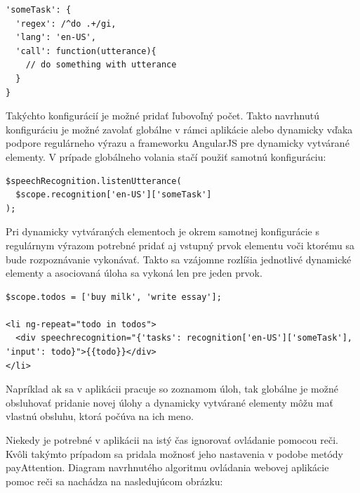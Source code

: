 \begin{lstlisting}
'someTask': {
  'regex': /^do .+/gi,
  'lang': 'en-US',
  'call': function(utterance){
    // do something with utterance
  }
}
\end{lstlisting}


Takýchto konfigurácií je možné pridať ľubovoľný počet. Takto navrhnutú konfiguráciu je možné zavolať globálne v rámci aplikácie alebo dynamicky vďaka podpore regulárneho výrazu a frameworku AngularJS pre dynamicky vytvárané elementy. V prípade globálneho volania stačí použiť samotnú konfiguráciu:

\begin{lstlisting}
$speechRecognition.listenUtterance(
  $scope.recognition['en-US']['someTask']
);
\end{lstlisting}

Pri dynamicky vytváraných elementoch je okrem samotnej konfigurácie s regulárnym výrazom potrebné pridať aj vstupný prvok elementu voči ktorému sa bude rozpoznávanie vykonávať. Takto sa vzájomne rozlíšia jednotlivé dynamické elementy a asociovaná úloha sa vykoná len pre jeden prvok.

\begin{lstlisting}
$scope.todos = ['buy milk', 'write essay'];

<li ng-repeat="todo in todos">
  <div speechrecognition="{'tasks': recognition['en-US']['someTask'], 'input': todo}">{{todo}}</div>
</li>
\end{lstlisting}

Napríklad ak sa v aplikácii pracuje so zoznamom úloh, tak globálne je možné obsluhovať pridanie novej úlohy a dynamicky vytvárané elementy môžu mať vlastnú obsluhu, ktorá počúva na ich meno. 

Niekedy je potrebné v aplikácii na istý čas ignorovať ovládanie pomocou reči. Kvôli takýmto prípadom sa pridala možnosť jeho nastavenia v podobe metódy payAttention. Diagram navrhnutého algoritmu ovládania webovej aplikácie pomoc reči sa nachádza na nasledujúcom obrázku:

